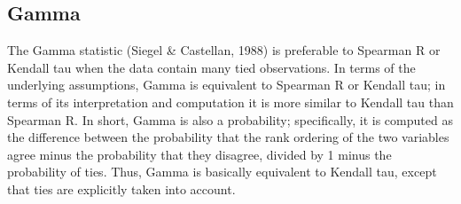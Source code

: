 
\subsection{Gamma} 
The Gamma statistic (Siegel & Castellan, 1988) is preferable to Spearman R or Kendall tau when the data contain many tied observations. In terms of the underlying assumptions, Gamma is equivalent to Spearman R or Kendall tau; in terms of its interpretation and computation it is more similar to Kendall tau than Spearman R. In short, Gamma is also a probability; specifically, it is computed as the difference between the probability that the rank ordering of the two variables agree minus the probability that they disagree, divided by 1 minus the probability of ties. Thus, Gamma is basically equivalent to Kendall tau, except that ties are explicitly taken into account.
